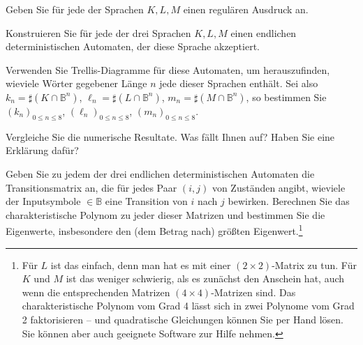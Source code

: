 \begin{flushenum}
\item Geben Sie für jede der Sprachen $K,L,M$ einen regulären Ausdruck an.

\item Konstruieren Sie für jede der drei Sprachen $K,L,M$ einen endlichen
	deterministischen Automaten, der diese Sprache akzeptiert.

\item Verwenden Sie Trellis-Diagramme für diese Automaten, um herauszufinden,
	wieviele Wörter gegebener Länge $n$ jede dieser Sprachen enthält. Sei
	also
	$k_n = \sharp (K \cap \mathbb{B}^n)$,
	$\ell_n = \sharp (L \cap \mathbb{B}^n)$,
	$m_n = \sharp (M \cap \mathbb{B}^n)$,
	so bestimmen Sie $(k_n)_{0 \leq n \leq 8}$,
	$(\ell_n)_{0 \leq n \leq 8}$,
	$(m_n)_{0 \leq n \leq 8}$.

\item Vergleiche Sie die numerische Resultate. Was fällt Ihnen auf?  Haben Sie
	eine Erklärung dafür?

\item Geben Sie zu jedem der drei endlichen deterministischen Automaten die
	Transitionsmatrix an, die für jedes Paar $(i,j)$ von Zuständen angibt,
	wieviele der Inputsymbole $\in \mathbb{B}$ eine Transition von $i$ nach
	$j$ bewirken. Berechnen Sie das charakteristische Polynom zu jeder
	dieser Matrizen und bestimmen Sie die Eigenwerte, insbesondere den (dem
	Betrag nach) größten Eigenwert.\footnote{
	Für $L$ ist das einfach, denn man hat es mit einer $(2 \times
	2)$-Matrix zu tun.  Für $K$ und $M$ ist das weniger schwierig, als es
	zunächst den Anschein hat, auch wenn die entsprechenden Matrizen $(4
	\times 4)$-Matrizen sind. Das charakteristische Polynom vom Grad 4
	lässt sich in zwei Polynome vom Grad 2 faktorisieren -- und
	quadratische Gleichungen können Sie per Hand lösen. Sie können aber
	auch geeignete Software zur Hilfe nehmen.
	}
\end{flushenum}
